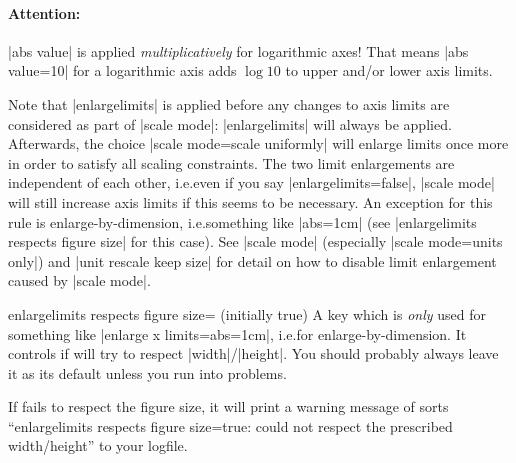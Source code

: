 \begin{pgfplotsxykeylist}
    \paragraph{Attention:}

    |abs value| is applied \emph{multiplicatively} for logarithmic axes! That
    means |abs value=10| for a logarithmic axis adds $\log 10$ to upper and/or
    lower axis limits.
\begin{codeexample}[]
\end{codeexample}

    Note that |enlargelimits| is applied before any changes to axis limits are
    considered as part of |scale mode|: |enlargelimits| will always be applied.
    Afterwards, the choice |scale mode=scale uniformly| will enlarge limits
    once more in order to satisfy all scaling constraints. The two limit
    enlargements are independent of each other, i.e.\@ even if you say
    |enlargelimits=false|, |scale mode| will still increase axis limits if this
    seems to be necessary. An exception for this rule is enlarge-by-dimension,
    i.e.\@ something like |abs=1cm| (see |enlargelimits respects figure size|
    for this case). See |scale mode| (especially |scale mode=units only|) and
    |unit rescale keep size| for detail on how to disable limit enlargement
    caused by |scale mode|.
\end{pgfplotsxykeylist}

\begin{pgfplotskey}{enlargelimits respects figure size= (initially true)}
    A key which is \emph{only} used for something like
    |enlarge x limits={abs=1cm}|, i.e.\@ for enlarge-by-dimension. It controls
    if \PGFPlots{} will try to respect |width|/|height|. You should probably
    always leave it as its default unless you run into problems.

    If \PGFPlots{} fails to respect the figure size, it will print a warning
    message of sorts ``enlargelimits respects figure size=true: could not
    respect the prescribed width/height'' to your logfile.
\end{pgfplotskey}

